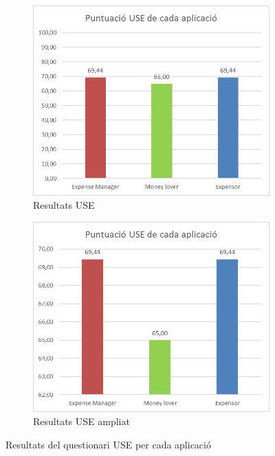 \begin{figure}
	\begin{subfigure}[b]{0.45\textwidth}
		\centering
		\includegraphics[scale=0.6]{USE_1.png}
		\caption{Resultats USE}
		\label{fig:USE_1}
	\end{subfigure}
	\quad
	\begin{subfigure}[b]{0.45\textwidth}
		\centering
		\includegraphics[scale=0.6]{USE_2.png}
		\caption{Resultats USE ampliat}
		\label{fig:USE_2}
	\end{subfigure}

\caption{Resultats del questionari USE per cada aplicació}\label{fig:USE_result}
\end{figure}

